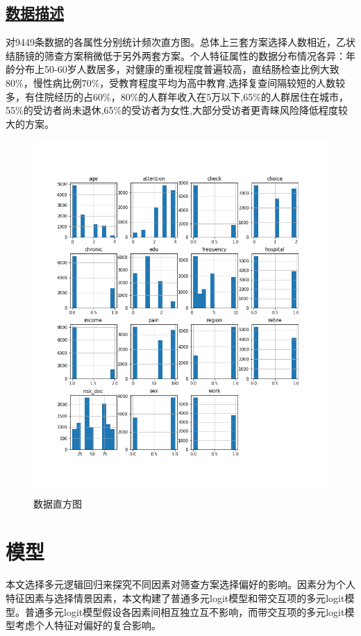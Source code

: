 \documentclass[10pt, conference, compsocconf]{IEEEtran}
\begin{document}
\begin{CJK}{UTF8}{gbsn}
\subsection{\underline{数据描述}}

对9449条数据的各属性分别统计频次直方图。总体上三套方案选择人数相近，乙状结肠镜的筛查方案稍微低于另外两套方案。个人特征属性的数据分布情况各异：年龄分布上50-60岁人数居多，对健康的重视程度普遍较高，直结肠检查比例大致80\%，慢性病比例70\%，受教育程度平均为高中教育,选择复查间隔较短的人数较多，有住院经历的占60\%，80\%的人群年收入在5万以下,65\%的人群居住在城市，55\%的受访者尚未退休,65\%的受访者为女性,大部分受访者更青睐风险降低程度较大的方案。
\begin{figure}[ht]
\centering
\includegraphics[scale=0.35]{hist.png}
\caption{数据直方图}
\end{figure}

\section{模型}
\vspace{0.5cm}
本文选择多元逻辑回归来探究不同因素对筛查方案选择偏好的影响。因素分为个人特征因素与选择情景因素，本文构建了普通多元logit模型和带交互项的多元logit模型。普通多元logit模型假设各因素间相互独立互不影响，而带交互项的多元logit模型考虑个人特征对偏好的复合影响。


\end{CJK}
\end{document}
